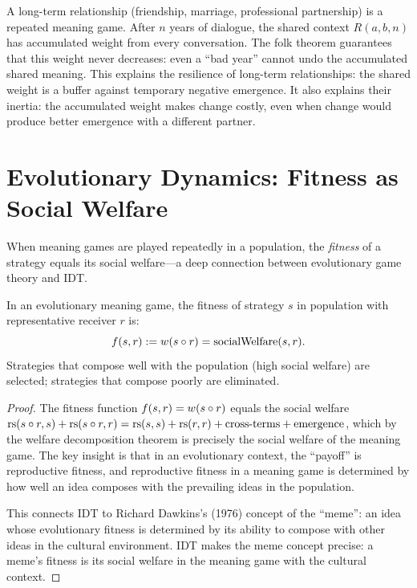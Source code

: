 \begin{example}
A long-term relationship (friendship, marriage, professional partnership)
is a repeated meaning game. After $n$ years of dialogue, the shared
context $R(a, b, n)$ has accumulated weight from every conversation.
The folk theorem guarantees that this weight never decreases: even a
``bad year'' cannot undo the accumulated shared meaning. This explains
the resilience of long-term relationships: the shared weight is a
buffer against temporary negative emergence. It also explains their
inertia: the accumulated weight makes change costly, even when change
would produce better emergence with a different partner.
\end{example}


\section{Evolutionary Dynamics: Fitness as Social Welfare}

When meaning games are played repeatedly in a population, the
\emph{fitness} of a strategy equals its social welfare---a deep
connection between evolutionary game theory and IDT.

\begin{theorem}
\label{thm:fitness-welfare}
In an evolutionary meaning game, the fitness of strategy $s$ in
population with representative receiver $r$ is:
\[
f(s, r) := w(s \circ r) = \text{socialWelfare}(s, r).
\]
Strategies that compose well with the population (high social welfare)
are selected; strategies that compose poorly are eliminated.
\end{theorem}

\begin{proof}
The fitness function $f(s, r) = w(s \circ r)$ equals the social welfare
$\mathrm{rs}(s \circ r, s) + \mathrm{rs}(s \circ r, r) = \mathrm{rs}(s, s) + \mathrm{rs}(r, r) +
\text{cross-terms} + \text{emergence}$, which by the welfare decomposition
theorem is precisely the social welfare of the meaning game. The key
insight is that in an evolutionary context, the ``payoff'' is
reproductive fitness, and reproductive fitness in a meaning game is
determined by how well an idea composes with the prevailing ideas in
the population.

This connects IDT to Richard Dawkins's (1976) concept of the ``meme'':
an idea whose evolutionary fitness is determined by its ability to
compose with other ideas in the cultural environment. IDT makes the
meme concept precise: a meme's fitness is its social welfare in the
meaning game with the cultural context.
\end{proof}

